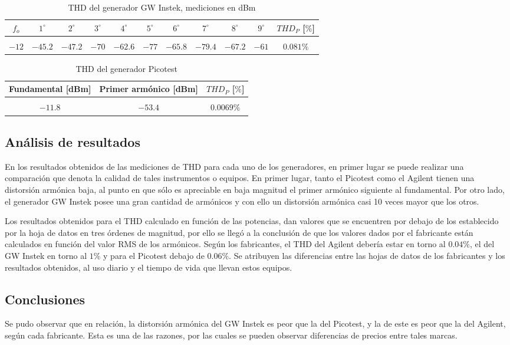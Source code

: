\begin{table}[H]
    \centering
    \begin{tabular}{c c c c c c c c c c c}
        $f_o$ & $1^{\circ}$ & $2^{\circ}$ & $3^{\circ}$ & $4^{\circ}$ & $5^{\circ}$ & $6^{\circ}$ & $7^{\circ}$ & $8^{\circ}$ & $9^{\circ}$ & $THD_P$ [$\%$] \\
        \hline \\
        $-12$ & $-45.2$ & $-47.2$ & $-70$ & $-62.6$ & $-77$ & $-65.8$ & $-79.4$ & $-67.2$ & $-61$ & $0.081 \%$ \\
        \hline
    \end{tabular}
    \caption{THD del generador GW Instek, mediciones en dBm}
\end{table}

\begin{table}[H]
    \centering
    \begin{tabular}{c c c}
        Fundamental [dBm] & Primer arm\'onico [dBm] & $THD_P$ [$\%$]\\
        \hline \\
        $-11.8$ & $-53.4$ & $0.0069\%$\\
        \hline
    \end{tabular}
    \caption{THD del generador Picotest}
\end{table}

\subsection{An\'alisis de resultados}
En los resultados obtenidos de las mediciones de THD para cada uno de los generadores, en primer lugar
se puede realizar una comparaci\'on que denota la calidad de tales instrumentos o equipos. En primer lugar,
tanto el Picotest como el Agilent tienen una distorsi\'on arm\'onica baja, al punto en que s\'olo es apreciable en baja
magnitud el primer arm\'onico siguiente al fundamental. Por otro lado, el generador GW Instek posee una gran cantidad de arm\'onicos
y con ello un distorsi\'on arm\'onica casi 10 veces mayor que los otros.

Los resultados obtenidos para el THD calculado en funci\'on de las potencias, dan valores que se encuentren por debajo de los establecido por la hoja de datos en tres \'ordenes de magnitud,
por ello se lleg\'o a la conclusi\'on de que los valores dados por el fabricante est\'an calculados en funci\'on del valor RMS de los arm\'onicos.
Seg\'un los fabricantes, el THD del Agilent deber\'ia estar en torno al $0.04\%$, el del GW Instek en torno al $1 \%$ y para el Picotest debajo de $0.06\%$.
Se atribuyen las diferencias entre las hojas de datos de los fabricantes y los resultados obtenidos, al uso diario y el tiempo de vida que llevan
estos equipos.


\subsection{Conclusiones}
Se pudo observar que en relaci\'on, la distorsi\'on arm\'onica del GW Instek es peor que la del Picotest, y la de este es peor que la del Agilent, seg\'un cada fabricante. Esta es una de las razones,
por las cuales se pueden observar diferencias de precios entre tales marcas.